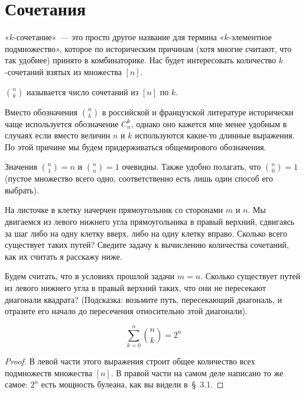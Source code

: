 \section{Сочетания}

«$k$-сочетание»~— это просто другое название для термина «$k$-элементное подмножество», которое по историческим причинам (хотя многие считают, что так удобнее) принято в комбинаторике. Нас будет интересовать количество $k$-сочетаний взятых из множества $[n]$.

\begin{definition}
 $n \choose k$ называется число сочетаний из $[n]$ по $k$.
\end{definition}

Вместо обозначения ${n \choose k}$ в российской и французской литературе исторически чаще используется обозначение $C^k_n$, однако оно кажется мне менее удобным в случаях если вместо величин $n$ и $k$ используются какие-то длинные выражения. По этой причине мы будем придерживаться общемирового обозначения.

Значения ${n \choose 1} = n$ и ${n \choose n} = 1$ очевидны. Также удобно полагать, что ${n \choose 0} =1$ (пустое множество всего одно, соответственно есть лишь один способ его выбрать). 

\begin{exercise}
На листочке в клетку начерчен прямоугольник со сторонами $m$ и $n$. Мы двигаемся из левого нижнего угла прямоугольника в правый верхний, сдвигаясь за шаг либо на одну клетку вверх, либо на одну клетку вправо. Сколько всего существует таких путей? Сведите задачу к вычислению количества сочетаний, как их считать я расскажу ниже.
\end{exercise}

\begin{exercise}
Будем считать, что в условиях прошлой задачи $m=n$. Сколько существует путей из левого нижнего угла в правый верхний таких, что они не пересекают диагонали квадрата? (Подсказка: возьмите путь, пересекающий диагональ, и отразите его начало до пересечения относительно этой диагонали).
\end{exercise}

\begin{thm}
$$\sum_{k=0}^n{n \choose k} = 2^n$$
\end{thm}
\begin{proof}
В левой части этого выражения строит общее количество всех подмножеств множества $[n]$. В правой части на самом деле написано то же самое: $2^n$ есть мощность булеана, как вы видели в~\S~3.1.
\end{proof}

